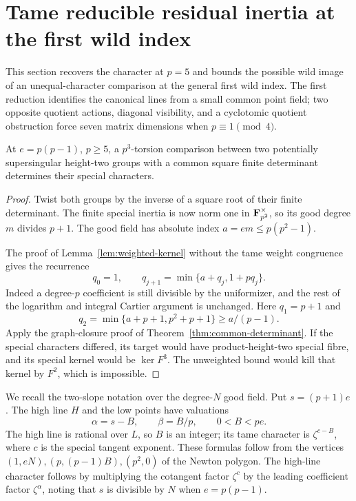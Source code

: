 \section{Tame reducible residual inertia at the first wild index}\label{sec:tame-reducible}
This section recovers the character at $p=5$ and bounds the possible wild image of an unequal-character comparison at the general first wild index. The first reduction identifies the canonical lines from a small common point field; two opposite quotient actions, diagonal visibility, and a cyclotomic quotient obstruction force seven matrix dimensions when $p\equiv1\pmod4$.

\begin{proposition}\label{prop:square-determinant}
At $e=p(p-1)$, $p\ge5$, a $p^3$-torsion comparison between two potentially supersingular height-two groups with a common square finite determinant determines their special characters.
\end{proposition}
\begin{proof}
Twist both groups by the inverse of a square root of their finite determinant. The finite special inertia is now norm one in $\mathbf F_{p^2}^\times$, so its good degree $m$ divides $p+1$. The good field has absolute index $a=em\le p(p^2-1)$.

The proof of Lemma~\ref{lem:weighted-kernel} without the tame weight congruence gives the recurrence
\[
                      q_0=1,\qquad q_{j+1}=\min\{a+q_j,1+pq_j\}.
\]
Indeed a degree-$p$ coefficient is still divisible by the uniformizer, and the rest of the logarithm and integral Cartier argument is unchanged. Here $q_1=p+1$ and
\[
                q_2=\min\{a+p+1,p^2+p+1\}\ge a/(p-1).
\]
Apply the graph-closure proof of Theorem~\ref{thm:common-determinant}. If the special characters differed, its target would have product-height-two special fibre, and its special kernel would be $\ker F^3$. The unweighted bound would kill that kernel by $F^2$, which is impossible.
\end{proof}

We recall the two-slope notation over the degree-$N$ good field. Put $s=(p+1)e$. The high line $H$ and the low points have valuations
\begin{equation}\label{eq:two-slope-B}
        \alpha=s-B,\qquad\beta=B/p,\qquad0<B<pe.
\end{equation}
The high line is rational over $L$, so $B$ is an integer; its tame character is $\zeta^{c-B}$, where $c$ is the special tangent exponent. These formulas follow from the vertices $(1,eN),(p,(p-1)B),(p^2,0)$ of the Newton polygon. The high-line character follows by multiplying the cotangent factor $\zeta^c$ by the leading coefficient factor $\zeta^\alpha$, noting that $s$ is divisible by $N$ when $e=p(p-1)$.

